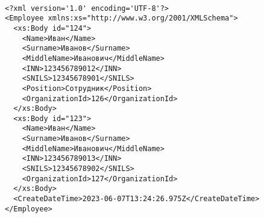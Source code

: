 

\
\begin{lstlisting}[style=XML,  label=lst:aggregationBinding]
<?xml version='1.0' encoding='UTF-8'?>
<Employee xmlns:xs="http://www.w3.org/2001/XMLSchema">
  <xs:Body id="124">
    <Name>Иван</Name>
    <Surname>Иванов</Surname>
    <MiddleName>Иванович</MiddleName>
    <INN>123456789012</INN>
    <SNILS>12345678901</SNILS>
    <Position>Сотрудник</Position>
    <OrganizationId>126</OrganizationId>
  </xs:Body>
  <xs:Body id="123">
    <Name>Иван</Name>
    <Surname>Иванов</Surname>
    <MiddleName>Иванович</MiddleName>
    <INN>123456789013</INN>
    <SNILS>12345678902</SNILS>
    <OrganizationId>127</OrganizationId>
  </xs:Body>
  <CreateDateTime>2023-06-07T13:24:26.975Z</CreateDateTime>
</Employee>
\end{lstlisting}